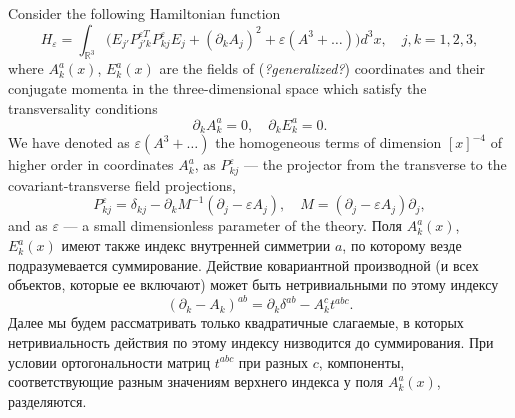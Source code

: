 \documentclass[12pt]{article}
\newcommand{\pl}{\partial}
\newcommand{\RR}{\mathbb{R}}
\newcommand{\ve}{\varepsilon}
\begin{document}
	Consider the following Hamiltonian function
\begin{equation}
\label{qH3}
    H_{\ve}
    = \int_{\RR^{3}} \bigl(E_{j'}P_{j'k}^{\ve T}P_{kj}^{\ve}
	E_{j} + (\pl_{k} A_{j})^{2}
	+ \ve (A^{3}+\ldots) \bigr) d^{3}x ,\quad j,k= 1,2,3,
\end{equation}
    where
$ A_{k}^{a}(x) $,
$ E_{k}^{a}(x) $ are the fields of ({\it ?generalized?}) coordinates and their conjugate momenta
	in the three-dimensional space which satisfy the transversality conditions
\begin{equation}
\label{transAE}
    \pl_{k} A_{k}^{a} = 0, \quad 
    \pl_{k} E_{k}^{a} = 0 .
\end{equation}
	We have denoted as 
$ \ve (A^{3}+\ldots) $
	the homogeneous terms of dimension
$ [x]^{-4} $
	of higher order in coordinates
$ A_{k}^{a} $,
	as
$ P_{kj}^{\ve} $ --- the projector from the transverse
	to the covariant-transverse field projections,
\begin{equation*}
    P_{kj}^{\ve}
	= \delta_{kj} - \pl_{k} M^{-1} (\pl_{j}-\ve A_{j}),
	\quad M = (\pl_{j} - \ve A_{j}) \pl_{j} ,
\end{equation*}
    and as
$ \ve $ --- a small dimensionless parameter of the theory.
    Поля
$ A_{k}^{a}(x) $,
$ E_{k}^{a}(x) $
    имеют также индекс внутренней симметрии
$ a $,
    по которому везде подразумевается суммирование. Действие ковариантной
    производной (и всех объектов, которые ее включают)
    может быть нетривиальными по этому индексу
\begin{equation*}
    (\pl_{k}-A_{k})^{ab} = \pl_{k} \delta^{ab} - A_{k}^{c} t^{abc} .
\end{equation*}
    Далее мы будем рассматривать только квадратичные
    слагаемые, в которых нетривиальность действия по этому индексу
    низводится до суммирования. При условии ортогональности матриц
$ t^{abc} $
    при разных
$ c $,
    компоненты, соответствующие разным значениям верхнего индекса у поля
$ A_{k}^{a}(x) $,
    разделяются.
\end{document}
